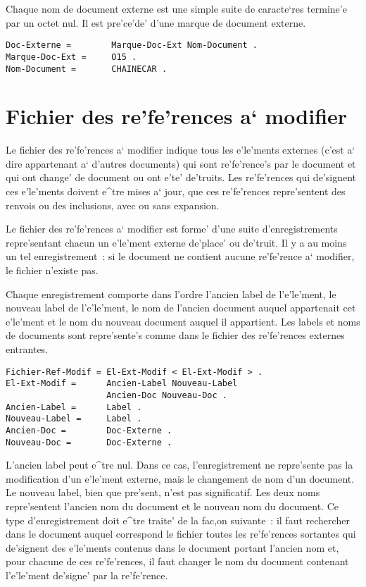 Chaque nom de document externe est une simple suite de caracte`res termine'e
par un octet nul. Il est pre'ce'de' d'une marque de document externe.
\begin{verbatim}
Doc-Externe =        Marque-Doc-Ext Nom-Document .
Marque-Doc-Ext =     O15 .
Nom-Document =       CHAINECAR .
\end{verbatim}

\section{Fichier des re'fe'rences a` modifier}

Le fichier des re'fe'rences a` modifier indique tous les e'le'ments externes
(c'est a` dire appartenant a` d'autres documents) qui sont re'fe'rence's
par le document et qui ont change' de document ou ont e'te' de'truits.
Les re'fe'rences qui de'signent ces e'le'ments doivent e^tre mises a` jour,
que ces re'fe'rences repre'sentent des renvois ou des inclusions, avec ou
sans expansion.

Le fichier des re'fe'rences a` modifier est forme' d'une suite
d'enregistrements repre'sentant chacun un e'le'ment externe de'place' ou
de'truit. Il y a au moins un tel enregistrement~: si le document ne contient
aucune re'fe'rence a` modifier, le fichier n'existe pas.

Chaque enregistrement comporte dans l'ordre l'ancien label de l'e'le'ment,
le nouveau label de l'e'le'ment, le nom de l'ancien document auquel
appartenait cet e'le'ment et le nom du nouveau document auquel il appartient.
Les labels et noms de documents sont repre'sente's comme dans le fichier
des re'fe'rences externes entrantes.

\begin{verbatim}
Fichier-Ref-Modif = El-Ext-Modif < El-Ext-Modif > .
El-Ext-Modif =      Ancien-Label Nouveau-Label
                    Ancien-Doc Nouveau-Doc .
Ancien-Label =      Label .
Nouveau-Label =     Label .
Ancien-Doc =        Doc-Externe .
Nouveau-Doc =       Doc-Externe .
\end{verbatim}

L'ancien label peut e^tre nul. Dans ce cas, l'enregistrement ne repre'sente
pas la modification d'un e'le'ment externe, mais le changement de nom
d'un document. Le nouveau label, bien que pre'sent, n'est pas significatif.
Les deux noms repre'sentent l'ancien nom du document et le nouveau nom du
document. Ce type d'enregistrement doit e^tre traite' de la fac,on suivante~:
il faut rechercher dans le document auquel correspond le fichier toutes les
re'fe'rences sortantes qui de'signent des e'le'ments contenus dans le document
portant l'ancien nom et, pour chacune de ces re'fe'rences, il faut changer le
nom du document contenant l'e'le'ment de'signe' par la re'fe'rence.

